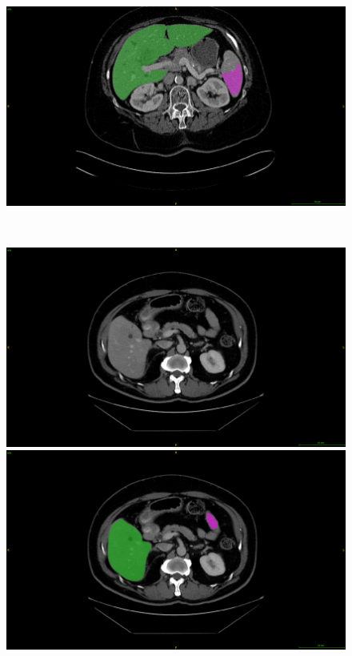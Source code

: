 \documentclass[]{article}
\begin{document}
\begin{figure}[ht!]
\begin{minipage}{0.45\linewidth}
	\end{minipage} \hspace{-0.1cm}
	\begin{minipage}{0.45\linewidth}
		\includegraphics[width=\linewidth]{../Contributions/images/MisSegmentations/ResizeTCGA-BC-A10Z_slice30_liverPrediction_Cmap}
	\end{minipage} \\
	\begin{minipage}{0.45\linewidth}
		\includegraphics[width=\linewidth]{../Contributions/images/MisSegmentations/ResizeTCGA-DD-A1EA_slice30_raw}
	\end{minipage} \hspace{-0.1cm}
	\begin{minipage}{0.45\linewidth}
		\includegraphics[width=\linewidth]{../Contributions/images/MisSegmentations/ResizeTCGA-DD-A1EA_slice30_liverPrediction_Cmap}

\end{minipage}
\end{figure}
\end{document}
